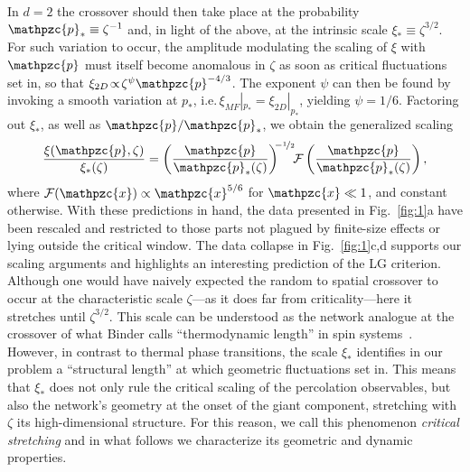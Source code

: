 \documentclass[aps, groupedaddress, superscriptaddress, prl, reprint]{revtex4-1}
\begin{document}
In $d=2$ the crossover should then take place at the probability $\mathpzc{p}_*\equiv\zeta^{-1}$ and, in light of the above, at the intrinsic scale $\xi_*\equiv\zeta^{3/2}$.
For such variation to occur, the amplitude modulating the scaling of $\xi$ with $\mathpzc{p}$ must itself become anomalous in $\zeta$ as soon as critical fluctuations set in, so that $\xi_{2D}\!\propto\!\zeta^{\psi}\mathpzc{p}^{-4/3}$. 
The exponent $\psi$ can then be found by invoking a smooth variation at $p_*$, i.e.\,$\xi_{MF}|_{p_*}=\xi_{2D}|_{p_*}$, yielding $\psi=1/6$. 
Factoring out $\xi_*$, as well as $\mathpzc{p}/\mathpzc{p}_*$, we obtain the generalized scaling
\begin{equation}\label{eq:1}
\frac{\xi(\mathpzc{p},\zeta)}{\xi_*(\zeta)}=\left(\frac{\mathpzc{p}}{\mathpzc{p}_*(\zeta)}\right)^{\!\!-\nicefrac{1}{2}}\!\!\mathcal{F}\left(\frac{\mathpzc{p}}{\mathpzc{p}_*(\zeta)}\right),
\end{equation}
where $\mathcal{F}(\mathpzc{x})\propto \mathpzc{x}^{\-5/6}$ for $\mathpzc{x}\ll1$, and constant otherwise. 
With these predictions in hand, the data presented in Fig.~\ref{fig:1}a have been rescaled and restricted to those parts not plagued by finite-size effects or lying outside the critical window. 
The data collapse in Fig.~\ref{fig:1}c,d supports our scaling arguments and highlights an interesting prediction of the LG criterion. 
Although one would have naively expected the random to spatial crossover to occur at the characteristic scale $\zeta$---as it does far from criticality---here it stretches until $\zeta^{3/2}$. 
This scale can be understood as the network analogue at the crossover of what Binder calls ``thermodynamic length'' %
in spin systems~\cite{Bin001}.
However, in contrast to thermal phase transitions, the scale $\xi_*$ identifies in our problem a ``structural length'' at which geometric fluctuations set in.
This means that $\xi_*$ does not only rule the critical scaling of the percolation observables, but also the network's geometry at the onset of the giant component, stretching with $\zeta$ its high-dimensional structure. 
For this reason, we call this phenomenon {\em critical stretching} and in what follows we characterize its geometric and dynamic properties.
\end{document}
